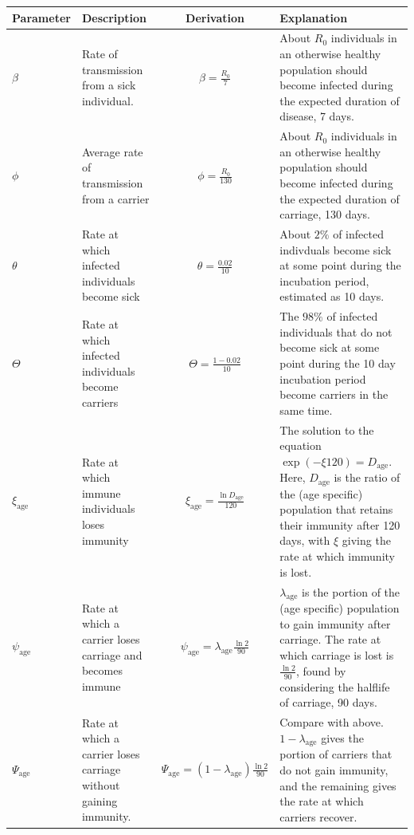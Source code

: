 \documentclass[10pt,a4paper]{article}
\begin{document}
\begin{appendices}
\begin{longtable}{l|p{4cm}|c|p{4cm}}
	Parameter						& Description													& Derivation 								& Explanation							\\ \hline
	$\beta$							& Rate of transmission from a sick individual.					& $\beta = \frac{R_0}{7}$					& About $R_0$ individuals in an otherwise healthy population should become infected during the expected duration of disease, 7 days.																											\\ \hline
	$\phi$							& Average rate of transmission from a carrier					& $\phi = \frac{R_0}{130}$					& About $R_0$ individuals in an otherwise healthy population should become infected during the expected duration of carriage, 130 days.																										\\ \hline
	$\theta$						& Rate at which infected individuals become sick				& $\theta = \frac{0.02}{10}$				& About $2\%$ of infected indivduals become sick at some point during the incubation period, estimated as 10 days.																																\\ \hline
	$\Theta$						& Rate at which infected individuals become carriers			& $\Theta = \frac{1-0.02}{10}$				& The $98\%$ of infected individuals that do not become sick at some point during the 10 day incubation period become carriers in the same time.																									\\ \hline
	$\xi_{\textrm{age}}$			& Rate at which immune individuals loses immunity				& $\xi_{\textrm{age}} = \frac{\ln D_{\textrm{age}}}{120}$	& The solution to the equation $\exp \left( -\xi 120 \right) = D_{\textrm{age}}$. Here, $D_{\textrm{age}}$ is the ratio of the (age specific) population that retains their immunity after 120 days, with $\xi$ giving the rate at which immunity is lost.
																																													\\ \hline
	$\psi_{\textrm{age}}$			& Rate at which a carrier loses carriage and becomes immune	& $\psi_{\textrm{age}} = \lambda_{\textrm{age}} \frac{\ln 2}{90}$	& $\lambda_{\textrm{age}}$ is the portion of the (age specific) population to gain immunity after carriage. The rate at which carriage is lost is $\frac{\ln 2}{90}$, found by considering the halflife of carriage, 90 days.
																																													\\ \hline
	$\Psi_{\textrm{age}}$			& Rate at which a carrier loses carriage without gaining immunity.	& $\Psi_{\textrm{age}} = \left( 1 - \lambda_{\textrm{age}} \right) \frac{\ln 2}{90}$	& Compare with above. $1 - \lambda_{\textrm{age}}$ gives the portion of carriers that do not gain immunity, and the remaining gives the rate at which carriers recover.					\\ \hline

\end{longtable}
\end{appendices}
\end{document}
